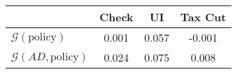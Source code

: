 \begin{tabular}{@{}lccc@{}}
\toprule
                          & Check      & UI    & Tax Cut    \\  \midrule
$\mathcal{G}(\text{policy})$ & 0.001  & 0.057  & -0.001     \\
$\mathcal{G}(AD,\text{policy})$ & 0.024  & 0.075  & 0.008     \\
\end{tabular}
